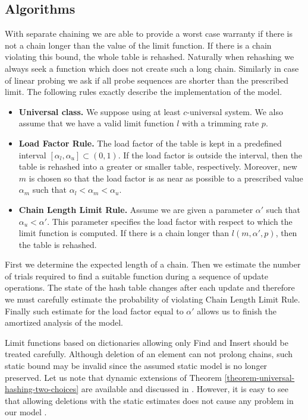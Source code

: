 \subsection{Algorithms}
With separate chaining we are able to provide a worst case warranty if there is not a chain longer than the value of the limit function. If there is a chain violating this bound, the whole table is rehashed. Naturally when rehashing we always seek a function which does not create such a long chain. Similarly in case of linear probing we ask if all probe sequences are shorter than the prescribed limit. The following rules exactly describe the implementation of the model.
\begin{itemize}
\item \textbf{Universal class.} We suppose using at least $c$-universal system. We also assume that we have a valid limit function $l$ with a trimming rate $p$.

\item \textbf{Load Factor Rule.} The load factor of the table is kept in a predefined interval $[\alpha_l, \alpha_u] \subset (0, 1)$. If the load factor is outside the interval, then the table is rehashed into a greater or smaller table, respectively. Moreover, new $m$ is chosen so that the load factor is as near as possible to a prescribed value $\alpha_m$ such that $\alpha_l < \alpha_m < \alpha_u$. 

\item \textbf{Chain Length Limit Rule.} Assume we are given a parameter $\alpha'$ such that $\alpha_u < \alpha'$. This parameter specifies the load factor with respect to which the limit function is computed. If there is a chain longer than $l(m, \alpha', p)$, then the table is rehashed.
\end{itemize}

First we determine the expected length of a chain. Then we estimate the number of trials required to find a suitable function during a sequence of update operations. The state of the hash table changes after each update and therefore we must carefully estimate the probability of violating Chain Length Limit Rule. Finally such estimate for the load factor equal to $\alpha'$ allows us to finish the amortized analysis of the model.

Limit functions based on dictionaries allowing only Find and Insert should be treated carefully. Although deletion of an element can not prolong chains, such static bound may be invalid since the assumed static model is no longer preserved. Let us note that dynamic extensions of Theorem \ref{theorem-universal-hashing-two-choices} are available and discussed in \cite{DBLP:journals/jacm/Vocking03}. However, it is easy to see that allowing deletions with the static estimates does not cause any problem in our model .

